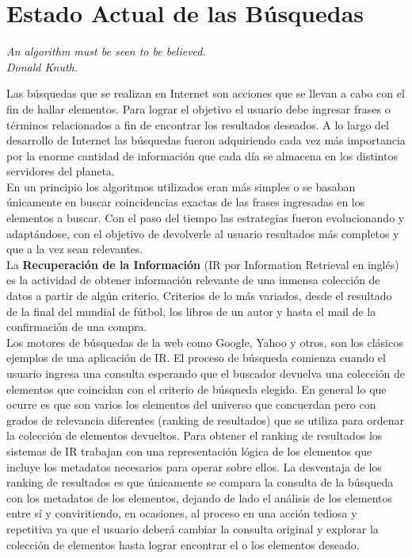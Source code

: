 \section{Estado Actual de las Búsquedas}
{\begin{small}%
\begin{flushright}%
\it An algorithm must be seen to be believed.\\Donald Knuth.
\end{flushright}%
\end{small}%
\vspace{.5cm}}
Las búsquedas que se realizan en Internet son acciones que se llevan a cabo con el fin de hallar elementos. Para lograr el objetivo el usuario debe ingresar frases o términos relacionados a fin de encontrar los resultados deseados. A lo largo del desarrollo de Internet las búsquedas fueron adquiriendo cada vez más importancia por la enorme cantidad de información que cada día se almacena en los distintos servidores del planeta.\\
En un principio los algoritmos utilizados eran más simples o se basaban únicamente en buscar coincidencias exactas de las frases ingresadas en los elementos a buscar. Con el paso del tiempo las estrategias fueron evolucionando y adaptándose, con el objetivo de devolverle al usuario resultados más completos y que a la vez sean relevantes.\\
La \textbf{Recuperación de la Información} (IR por Information Retrieval en inglés) es la actividad de obtener información relevante de una inmensa colección de datos a partir de algún criterio. Criterios de lo más variados, desde el resultado de la final del mundial de fútbol, los libros de un autor y hasta el mail de la confirmación de una compra.\\
Los motores de búsquedas de la web como Google, Yahoo y otros, son los clásicos ejemplos de una aplicación de IR. El proceso de búsqueda comienza cuando el usuario ingresa una consulta esperando que el buscador devuelva una colección de elementos que coincidan con el criterio de búsqueda elegido. En general lo que ocurre es que son varios los elementos del universo que concuerdan pero con grados de relevancia diferentes (ranking de resultados) que se utiliza para ordenar la colección de elementos devueltos. Para obtener el ranking de resultados los sistemas de IR trabajan con una representación lógica de los elementos que incluye los metadatos necesarios para operar sobre ellos. La desventaja de los ranking de resultados es que únicamente se compara la consulta de la búsqueda con los metadatos de los elementos, dejando de lado el análisis de los elementos entre sí y conviritiendo, en ocasiones, al proceso en una acción tediosa y repetitiva ya que el usuario deberá cambiar la consulta original y explorar la colección de elementos hasta lograr encontrar el o los elementos deseado.\\
